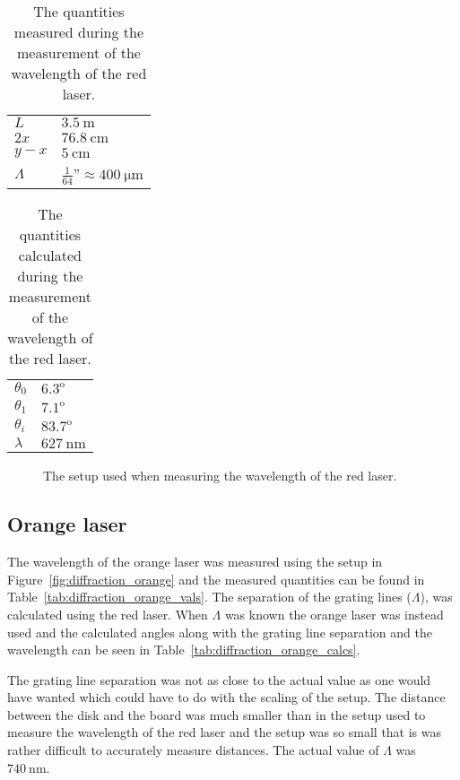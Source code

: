 \documentclass[12pt,a4paper]{article}
\begin{document}
\begin{table}
  \centering
  \begin{tabular}{|l|l|}\hline
    $L$ & $\SI{3.5}{\metre}$ \\
    $2x$ & $\SI{76.8}{\centi\metre}$ \\
    $y-x$ & $\SI{5}{\centi\metre}$ \\ 
    $\Lambda$ & $\frac{1}{64}$''$\approx\SI{400}{\micro\metre}$ \\ \hline
  \end{tabular}
  \caption{The quantities measured during the measurement of the wavelength of the red laser.}
  \label{tab:diffraction_red_vals}
\end{table}
\begin{table}
  \centering
  \begin{tabular}{|l|l|}\hline
    $\theta_0$ & $6.3^\text{o}$ \\
    $\theta_1$ & $7.1^\text{o}$ \\
    $\theta_i$ & $83.7^\text{o}$ \\
    $\lambda$ & $\SI{627}{\nano\metre}$ \\ \hline
  \end{tabular}
  \caption{The quantities calculated during the measurement of the wavelength of the red laser.}
  \label{tab:diffraction_red_calcs}
\end{table}
\begin{figure}
  \centering
  \noindent\makebox[\textwidth]{\scalebox{0.80}{}}
  \caption{The setup used when measuring the wavelength of the red laser.}
  \label{fig:diffraction_red}
\end{figure}
\subsection{Orange laser}
The wavelength of the orange laser was measured using the setup in Figure~\ref{fig:diffraction_orange} and the measured quantities can be found in Table~\ref{tab:diffraction_orange_vals}. The separation of the grating lines ($\Lambda$), was calculated using the red laser. When $\Lambda$ was known the orange laser was instead used and the calculated angles along with the grating line separation and the wavelength can be seen in Table~\ref{tab:diffraction_orange_calcs}.

The grating line separation was not as close to the actual value as one would have wanted which could have to do with the scaling of the setup. The distance between the disk and the board was much smaller than in the setup used to measure the wavelength of the red laser and the setup was so small that is was rather difficult to accurately measure distances. The actual value of $\Lambda$ was $\SI{740}{\nano\metre}$.
\end{document}
